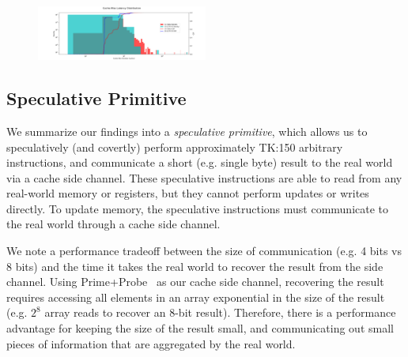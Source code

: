 

\begin{figure}[h]
    \centering
        \includegraphics[width=0.5\textwidth]{figures/cache_miss_dist}
    \caption{}
    \label{fig:cache-miss}
\end{figure}

\subsection{Speculative Primitive}

We summarize our findings into a \emph{speculative primitive}, which allows us to
speculatively (and covertly) perform approximately TK:150 arbitrary
instructions, and communicate a short (e.g. single byte) result to the real
world via a cache side channel. These speculative instructions are able to read
from any real-world memory or registers, but they cannot perform updates or
writes directly. To update memory, the speculative instructions must communicate
to the real world through a cache side channel.

We note a performance tradeoff between the size of communication (e.g. 4 bits vs 8
bits) and the time it takes the real world to recover the result from the side
channel. Using Prime+Probe~\cite{prime-probe} as our cache side channel,
recovering the result requires accessing all elements in an array exponential in
the size of the result (e.g. $2^8$ array reads to recover an 8-bit result). 
Therefore, there is a
performance advantage for keeping the size of the result small, and communicating
out small pieces of information that are aggregated by the real world.


